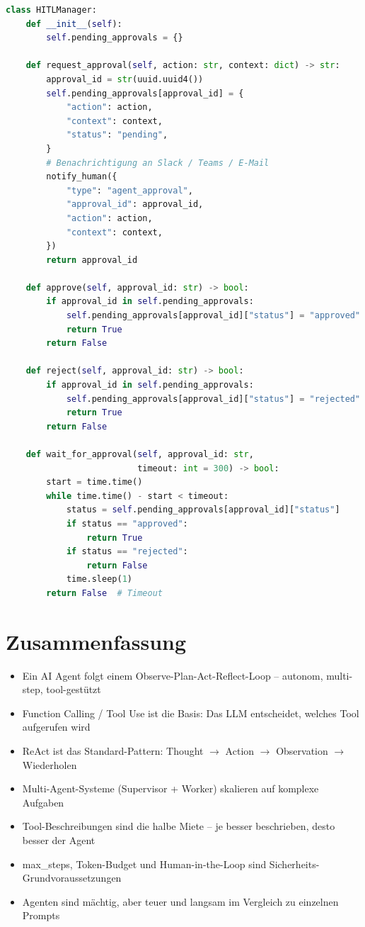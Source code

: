 \begin{lstlisting}[language=Python, caption=Human-in-the-Loop Pattern]
class HITLManager:
    def __init__(self):
        self.pending_approvals = {}

    def request_approval(self, action: str, context: dict) -> str:
        approval_id = str(uuid.uuid4())
        self.pending_approvals[approval_id] = {
            "action": action,
            "context": context,
            "status": "pending",
        }
        # Benachrichtigung an Slack / Teams / E-Mail
        notify_human({
            "type": "agent_approval",
            "approval_id": approval_id,
            "action": action,
            "context": context,
        })
        return approval_id

    def approve(self, approval_id: str) -> bool:
        if approval_id in self.pending_approvals:
            self.pending_approvals[approval_id]["status"] = "approved"
            return True
        return False

    def reject(self, approval_id: str) -> bool:
        if approval_id in self.pending_approvals:
            self.pending_approvals[approval_id]["status"] = "rejected"
            return True
        return False

    def wait_for_approval(self, approval_id: str,
                          timeout: int = 300) -> bool:
        start = time.time()
        while time.time() - start < timeout:
            status = self.pending_approvals[approval_id]["status"]
            if status == "approved":
                return True
            if status == "rejected":
                return False
            time.sleep(1)
        return False  # Timeout
\end{lstlisting}

\section{Zusammenfassung}

\begin{itemize}[leftmargin=*]
    \item Ein AI Agent folgt einem Observe-Plan-Act-Reflect-Loop -- autonom, multi-step, tool-gestützt
    \item Function Calling / Tool Use ist die Basis: Das LLM entscheidet, welches Tool aufgerufen wird
    \item ReAct ist das Standard-Pattern: Thought $\rightarrow$ Action $\rightarrow$ Observation $\rightarrow$ Wiederholen
    \item Multi-Agent-Systeme (Supervisor + Worker) skalieren auf komplexe Aufgaben
    \item Tool-Beschreibungen sind die halbe Miete -- je besser beschrieben, desto besser der Agent
    \item max\_steps, Token-Budget und Human-in-the-Loop sind Sicherheits-Grundvoraussetzungen
    \item Agenten sind mächtig, aber teuer und langsam im Vergleich zu einzelnen Prompts
\end{itemize}

